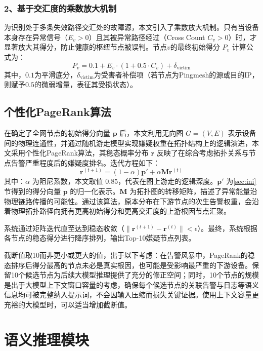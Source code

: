 \subsubsection{2、基于交汇度的乘数放大机制}

为识别处于多条失效路径交汇处的故障源，本文引入了乘数放大机制。只有当设备本身存在异常信号（$E_v > 0$）且其被异常路径经过（Cross Count $C_v > 0$）时，才显著放大其得分，防止健康的枢纽节点被误判。节点$v$的最终初始得分 $P_v$ 计算公式为：
\begin{equation}
P_v = 0.1 + E_v \cdot (1 + 0.5 \cdot C_v) + \delta_{\text{victim}}
\end{equation}
其中，$0.1$为平滑底分，$\delta_{\text{victim}}$为受害者补偿项（若节点为Pingmesh的源或目的IP，则赋予$0.5$的微弱增量，表征其受损状态）。

\subsection{个性化PageRank算法}
在确定了全网节点的初始得分向量 $\mathbf{p}$ 后，本文利用无向图 $G=(V,E)$ 表示设备间的物理连通性，并通过随机游走模型实现嫌疑权重在拓扑结构上的逻辑演进，本文采用个性化PageRank算法，其稳态概率分布 $\mathbf{r}$ 反映了在综合考虑拓扑关系与节点告警严重程度后的嫌疑度排名。迭代方程如下：
\begin{equation}
\mathbf{r}^{(t+1)} = (1 - \alpha) \mathbf{p}' + \alpha \mathbf{M} \mathbf{r}^{(t)}
\end{equation}
其中：$\alpha$ 为阻尼系数，本文取值 $0.85$，代表在图上游走的逻辑深度。$\mathbf{p}'$ 为\ref{sec:ini}节得到的得分向量 $\mathbf{p}$ 的归一化表示。$\mathbf{M}$ 为拓扑图的转移矩阵，描述了异常能量沿物理链路传播的可能性。通过该算法，原本分布在下游节点的次生告警权重，会沿着物理拓扑路径向拥有更高初始得分和更高交汇度的上游根因节点汇聚。

系统通过矩阵迭代直至达到稳态收敛（$\|\mathbf{r}^{(t+1)} - \mathbf{r}^{(t)}\| < \epsilon$）。最终，系统根据各节点的稳态得分进行降序排列，输出Top-10嫌疑节点列表。

截断值取10而非更小或更大的值，出于以下考虑：在告警风暴中，PageRank的稳态排序后得分最高的节点未必是真实根因，也可能是受影响最严重的下游设备。保留10个候选节点为后续大模型推理提供了充分的修正空间；同时，10个节点的规模是出于大模型上下文窗口容量的考虑，确保每个候选节点的关联告警与日志等语义信息均可被完整纳入提示词，不会因输入压缩而损失关键证据。使用上下文容量更充裕的大模型时，可以适当增加截断值。


\section{语义推理模块}

